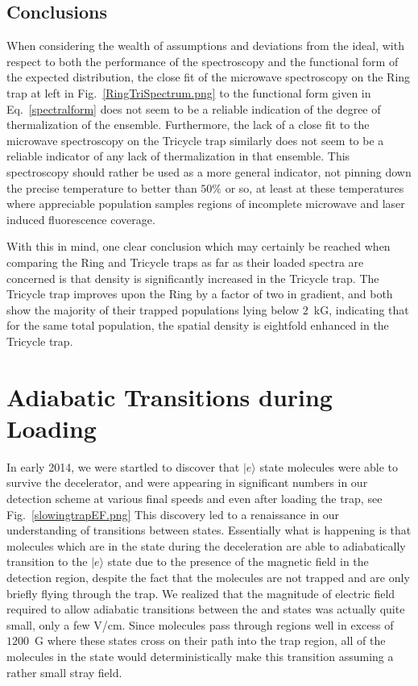 \subsection{Conclusions}

When considering the wealth of assumptions and deviations from the ideal, with respect to both the performance of the spectroscopy and the functional form of the expected distribution, the close fit of the microwave spectroscopy on the Ring trap at left in Fig.~\ref{RingTriSpectrum.png} to the functional form given in Eq.~\ref{spectralform} does not seem to be a reliable indication of the degree of thermalization of the ensemble.
Furthermore, the lack of a close fit to the microwave spectroscopy on the Tricycle trap similarly does not seem to be a reliable indicator of any lack of thermalization in that ensemble.
This spectroscopy should rather be used as a more general indicator, not pinning down the precise temperature to better than $50\%$ or so, at least at these temperatures where appreciable population samples regions of incomplete microwave and laser induced fluorescence coverage.

With this in mind, one clear conclusion which may certainly be reached when comparing the Ring and Tricycle traps as far as their loaded spectra are concerned is that density is significantly increased in the Tricycle trap.
The Tricycle trap improves upon the Ring by a factor of two in gradient, and both show the majority of their trapped populations lying below $2$~kG, indicating that for the same total population, the spatial density is eightfold enhanced in the Tricycle trap.

\section{Adiabatic Transitions during Loading}
\label{loadingtransitions}

In early 2014, we were startled to discover that $|e\rangle$ state molecules were able to survive the decelerator, and were appearing in significant numbers in our detection scheme at various final speeds and even after loading the trap, see Fig.~\ref{slowingtrapEF.png}
This discovery led to a renaissance in our understanding of transitions between states.
Essentially what is happening is that molecules which are in the  state during the deceleration are able to adiabatically transition to the $|e\rangle$ state due to the presence of the magnetic field in the detection region, despite the fact that the molecules are not trapped and are only briefly flying through the trap.
We realized that the magnitude of electric field required to allow adiabatic transitions between the  and  states was actually quite small, only a few V/cm.
Since molecules pass through regions well in excess of $1200$~G where these states cross on their path into the trap region, all of the molecules in the  state would deterministically make this transition assuming a rather small stray field.

